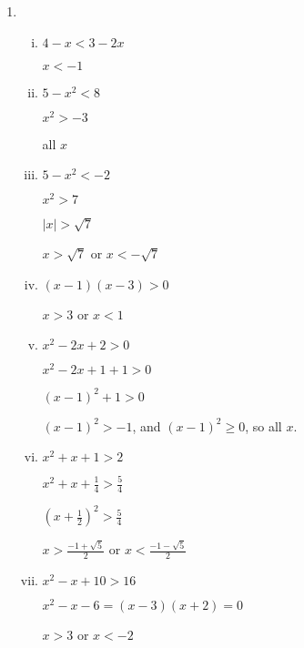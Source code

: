 \documentclass{amsart}
\begin{document}
\begin{enumerate}[1.]
\begin{enumerate}[(i)]
\begin{proof}
    Suppose in all cases that $b, d \neq 0$.
    
    First, suppose $\frac{a}{b}=\frac{c}{d}$. This implies that $ab^{-1}=cd^{-1}$. Multiplying both sides by $b, d$ we have $ad=bc$.

    Second, suppose $ad=bc$. Multiplying both sides by $b^{-1}, d^{-1}$, we $ab^{-1}=cd^{-1}$. This implies that $\frac{a}{b}=\frac{c}{d}$.
\end{proof}
Finally, consider the case when $\frac{a}{b}=\frac{b}{a}$. This assertion is equivalent to $a \cdot a = b \cdot b$, which means $a^{2}=b^{2}$. This in turn implies that $a=b$ or $a=-b$, which is the condition under which the original equality holds.
\end{enumerate}
\item
  \begin{enumerate}[(i)]
  \item $4-x<3-2x$

    $x<-1$
  \item $5-x^{2}<8$

    $x^{2}>-3$

    all $x$

  \item
    $5-x^{2}<-2$

    $x^{2}>7$

    $\lvert x \rvert>\sqrt{7}$

    $x>\sqrt{7}$ or $x<-\sqrt{7}$

  \item $(x-1)(x-3)>0$

    $x>3$ or $x<1$

  \item $x^{2}-2x+2>0$

    $x^{2}-2x+1+1>0$

    $(x-1)^{2}+1>0$

    $(x-1)^{2}>-1$, and $(x-1)^{2} \geq 0$, so all $x$.

    \item $x^{2}+x+1>2$

      $x^{2}+x+\frac{1}{4}>\frac{5}{4}$

      $(x+\frac{1}{2})^{2}>\frac{5}{4}$

      $x>\frac{-1+\sqrt{5}}{2}$ or $x<\frac{-1-\sqrt{5}}{2}$

    \item $x^{2}-x+10>16$

      $x^{2}-x-6=(x-3)(x+2)=0$

      $x>3$ or $x<-2$


\end{enumerate}
\end{enumerate}
\end{document}
